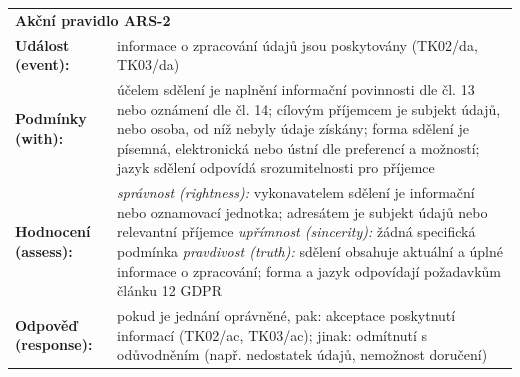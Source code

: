 \begin{itemize}
    \begin{center}
      \renewcommand{\arraystretch}{1.3}
      \begin{tabular}{p{4cm} p{8cm}}
      \multicolumn{2}{l}{\textbf{Akční pravidlo ARS-2}} \\
      \textbf{Událost (event):} & informace o zpracování údajů jsou poskytovány (TK02/da, TK03/da) \\
      \textbf{Podmínky (with):} & 
        účelem sdělení je naplnění informační povinnosti dle čl. 13 nebo oznámení dle čl. 14; \newline
        cílovým příjemcem je subjekt údajů, nebo osoba, od níž nebyly údaje získány; \newline
        forma sdělení je písemná, elektronická nebo ústní dle preferencí a možností; \newline
        jazyk sdělení odpovídá srozumitelnosti pro příjemce \\
      \textbf{Hodnocení (assess):} & 
        \textit{správnost (rightness):} \newline
        \quad vykonavatelem sdělení je informační nebo oznamovací jednotka; \newline
        \quad adresátem je subjekt údajů nebo relevantní příjemce \newline
        \textit{upřímnost (sincerity):} \newline
        \quad žádná specifická podmínka \newline
        \textit{pravdivost (truth):} \newline
        \quad sdělení obsahuje aktuální a úplné informace o zpracování; \newline
        \quad forma a jazyk odpovídají požadavkům článku 12 GDPR \\
      \textbf{Odpověď (response):} & 
        pokud je jednání oprávněné, pak: \newline
        \quad akceptace poskytnutí informací (TK02/ac, TK03/ac); \newline
        jinak: \newline
        \quad odmítnutí s odůvodněním (např. nedostatek údajů, nemožnost doručení) \\
      \end{tabular}
    \end{center}
      

\end{itemize}
